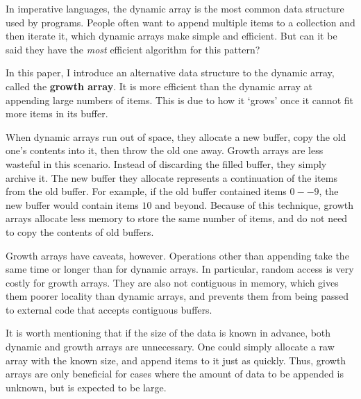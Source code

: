 In imperative languages, the dynamic array is the most common data structure used by programs. People often want to append multiple items to a collection and then iterate it, which dynamic arrays make simple and efficient. But can it be said they have the \textit{most} efficient algorithm for this pattern?

In this paper, I introduce an alternative data structure to the dynamic array, called the \textbf{growth array}. It is more efficient than the dynamic array at appending large numbers of items. This is due to how it `grows' once it cannot fit more items in its buffer.

When dynamic arrays run out of space, they allocate a new buffer, copy the old one's contents into it, then throw the old one away. Growth arrays are less wasteful in this scenario. Instead of discarding the filled buffer, they simply archive it. The new buffer they allocate represents a continuation of the items from the old buffer. For example, if the old buffer contained items $0 -- 9$, the new buffer would contain items $10$ and beyond. Because of this technique, growth arrays allocate less memory to store the same number of items, and do not need to copy the contents of old buffers.

Growth arrays have caveats, however. Operations other than appending take the same time or longer than for dynamic arrays. In particular, random access is very costly for growth arrays. They are also not contiguous in memory, which gives them poorer locality than dynamic arrays, and prevents them from being passed to external code that accepts contiguous buffers.

It is worth mentioning that if the size of the data is known in advance, both dynamic and growth arrays are unnecessary. One could simply allocate a raw array with the known size, and append items to it just as quickly. Thus, growth arrays are only beneficial for cases where the amount of data to be appended is unknown, but is expected to be large.